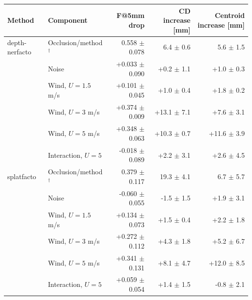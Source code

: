 \begin{tabular}{llrrr}
\toprule
Method & Component & F@5mm drop & CD increase [mm] & Centroid increase [mm] \\
\midrule
depth-nerfacto & Occlusion/method$^{\dagger}$ & 0.558 $\pm$ 0.078 & 6.4 $\pm$ 0.6 & 5.6 $\pm$ 1.5 \\
 & Noise & +0.033 $\pm$ 0.090 & +0.2 $\pm$ 1.1 & +1.0 $\pm$ 0.3 \\
 & Wind, $U=1.5$ m/s & +0.101 $\pm$ 0.045 & +1.0 $\pm$ 0.4 & +1.8 $\pm$ 0.2 \\
 & Wind, $U=3$ m/s & +0.374 $\pm$ 0.009 & +13.1 $\pm$ 7.1 & +7.6 $\pm$ 3.1 \\
 & Wind, $U=5$ m/s & +0.348 $\pm$ 0.063 & +10.3 $\pm$ 0.7 & +11.6 $\pm$ 3.9 \\
 & Interaction, $U=5$ & -0.018 $\pm$ 0.089 & +2.2 $\pm$ 3.1 & +2.6 $\pm$ 4.5 \\
\midrule
splatfacto & Occlusion/method$^{\dagger}$ & 0.379 $\pm$ 0.117 & 19.3 $\pm$ 4.1 & 6.7 $\pm$ 5.7 \\
 & Noise & -0.060 $\pm$ 0.055 & -1.5 $\pm$ 1.5 & +1.9 $\pm$ 3.1 \\
 & Wind, $U=1.5$ m/s & +0.134 $\pm$ 0.073 & +1.5 $\pm$ 0.4 & +2.2 $\pm$ 1.8 \\
 & Wind, $U=3$ m/s & +0.272 $\pm$ 0.112 & +4.3 $\pm$ 1.8 & +5.2 $\pm$ 6.7 \\
 & Wind, $U=5$ m/s & +0.341 $\pm$ 0.131 & +8.1 $\pm$ 4.7 & +12.0 $\pm$ 8.5 \\
 & Interaction, $U=5$ & +0.059 $\pm$ 0.054 & +1.4 $\pm$ 1.5 & -0.8 $\pm$ 2.1 \\
\bottomrule
\end{tabular}
